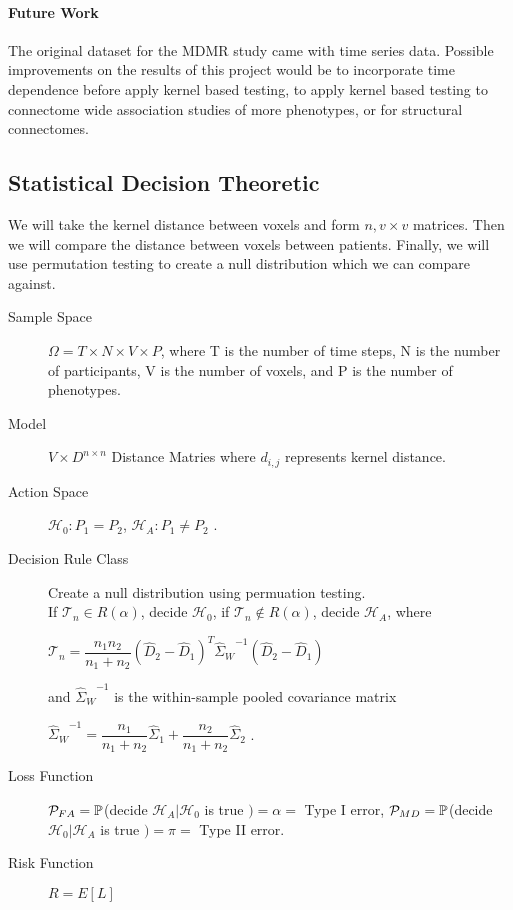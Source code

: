 \documentclass[12pt]{article}
\begin{document}
\paragraph{Future Work}
The original dataset for the MDMR study came with time series data. Possible improvements on the results of this project would be to incorporate time dependence before apply kernel based testing, to apply kernel based testing to connectome wide association studies of more phenotypes, or for structural connectomes.

\pagebreak
\subsection*{Statistical Decision Theoretic}
We will take the kernel distance between voxels and form $n, v \times v$ matrices. Then we will compare the distance between voxels between patients. Finally, we will use permutation testing to create a null distribution which we can compare against.

\begin{description}

\item[Sample Space] 
$\Omega={T \times N \times V \times P}$, where T is the number of time steps, N is the number of participants, V is the number of voxels, and P is the number of phenotypes.

\item[Model]
$V \times D^{n \times n}$ Distance Matries where $d_{i,j}$ represents kernel distance.

\item[Action Space]
$\mathcal{H}_0 : P_1 = P_2$,
$\mathcal{H}_A : P_1 \neq P_2$ \cite{Har}.

\item[Decision Rule Class] Create a null distribution using permuation testing. 
\\If $\mathcal{T}_n \in R(\alpha)$, decide $\mathcal{H}_0$, if $\mathcal{T}_n \not\in R(\alpha)$, decide $\mathcal{H}_A$, where
\begin{center}$\mathcal{T}_n = \dfrac{n_1n_2}{n_1 + n_2}{(\hat{D}_2 - \hat{D}_1)}^T{\hat{\Sigma}_W}^{-1}(\hat{D}_2 - \hat{D}_1)$ \end{center}
and ${\hat{\Sigma}_W}^{-1}$ is the within-sample pooled covariance matrix
\begin{center}  ${\hat{\Sigma}_W}^{-1} = \dfrac{n_1}{n_1 + n_2} \hat{\Sigma}_1 + \dfrac{n_2}{n_1 + n_2} \hat{\Sigma}_2$ \cite{Har}. \end{center}

\item[Loss Function]
$\\ \mathcal{P}_{FA} = \mathbb{P}$(decide $\mathcal{H}_A| \mathcal{H}_0$ is true $) = \alpha =$ Type I error,
$\\ \mathcal{P}_{MD} = \mathbb{P}$(decide $\mathcal{H}_0| \mathcal{H}_A$ is true $) = \pi =$ Type II error.

\item[Risk Function]
$R = E[L]$

\end{description}
\end{document}
